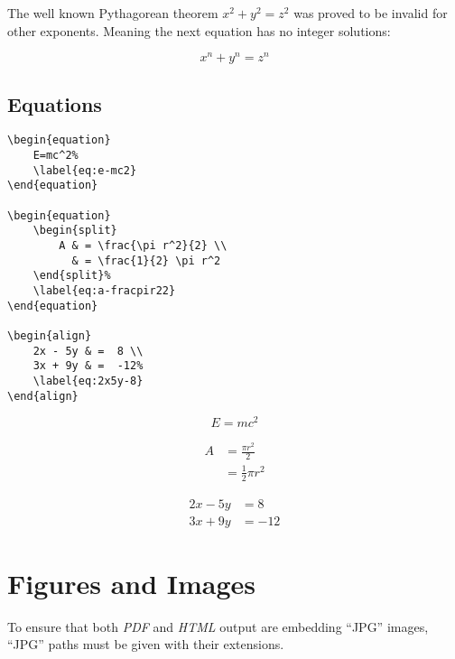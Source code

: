 The well known Pythagorean theorem \(x^2 + y^2 = z^2\) was proved to be invalid for other exponents.
Meaning the next equation has no integer solutions:

\[x^n + y^n = z^n\]

\subsection*{Equations}%
\label{subsec:equations}

\begin{lstlisting}[caption={Equations.}]
\begin{equation}
    E=mc^2%
    \label{eq:e-mc2}
\end{equation}

\begin{equation}
    \begin{split}
        A & = \frac{\pi r^2}{2} \\
          & = \frac{1}{2} \pi r^2
    \end{split}%
    \label{eq:a-fracpir22}
\end{equation}

\begin{align}
    2x - 5y & =  8 \\
    3x + 9y & =  -12%
    \label{eq:2x5y-8}
\end{align}
\end{lstlisting}

\begin{equation}
    E=mc^2%
    \label{eq:e-mc2}
\end{equation}

\begin{equation}
    \begin{split}
        A & = \frac{\pi r^2}{2} \\
          & = \frac{1}{2} \pi r^2
    \end{split}%
    \label{eq:a-fracpir22}
\end{equation}

\begin{align}
    2x - 5y & =  8 \\
    3x + 9y & =  -12%
    \label{eq:2x5y-8}
\end{align}

\section*{Figures and Images}%
\label{sec:figures-and-images}

To ensure that both \textit{PDF} and \textit{HTML} output are embedding ``JPG'' images, ``JPG'' paths must be given with their extensions.

